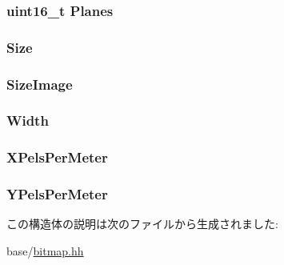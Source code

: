 \label{structBitmap_1_1Info_a3bdc883455d9732f65c9d4cb1aebe28b}
\hypertarget{structBitmap_1_1Info_a7b94b5971a41e2ef139ae0e861e4cd05}{
\subsubsection[{Planes}]{\setlength{\rightskip}{0pt plus 5cm}uint16\_\-t {\bf Planes}}}
\label{structBitmap_1_1Info_a7b94b5971a41e2ef139ae0e861e4cd05}
\hypertarget{structBitmap_1_1Info_a1f5ab05b3305a959d954b796c63807c4}{
\subsubsection[{Size}]{ {\bf Size}}}
\label{structBitmap_1_1Info_a1f5ab05b3305a959d954b796c63807c4}
\hypertarget{structBitmap_1_1Info_ae104eeae52491330995f913e37890fca}{
\subsubsection[{SizeImage}]{ {\bf SizeImage}}}
\label{structBitmap_1_1Info_ae104eeae52491330995f913e37890fca}
\hypertarget{structBitmap_1_1Info_ad672690f555bb08866a491753109e551}{
\subsubsection[{Width}]{ {\bf Width}}}
\label{structBitmap_1_1Info_ad672690f555bb08866a491753109e551}
\hypertarget{structBitmap_1_1Info_ab641907e3db73010d1bb565fb7555eb9}{
\subsubsection[{XPelsPerMeter}]{ {\bf XPelsPerMeter}}}
\label{structBitmap_1_1Info_ab641907e3db73010d1bb565fb7555eb9}
\hypertarget{structBitmap_1_1Info_a32247fa4a0f24af4fbeb0322bd237dad}{
\subsubsection[{YPelsPerMeter}]{ {\bf YPelsPerMeter}}}
\label{structBitmap_1_1Info_a32247fa4a0f24af4fbeb0322bd237dad}


この構造体の説明は次のファイルから生成されました:\begin{DoxyCompactItemize}
\item 
base/\hyperlink{bitmap_8hh}{bitmap.hh}\end{DoxyCompactItemize}
